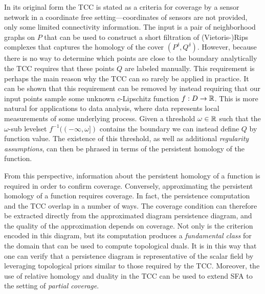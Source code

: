 In its original form the TCC is stated as a criteria for coverage by a sensor network in a coordinate free setting---coordinates of sensors are not provided, only some limited connectivity information.
The input is a pair of neighborhood graphs on $P$ that can be used to construct a short filtration of (Vietoris-)Rips complexes that captures the homology of the cover $(P^\delta, Q^\delta)$.
However, because there is no way to determine which points are close to the boundary analytically the TCC requires that these points $Q$ are labeled manually.
This requirement is perhaps the main reason why the TCC can so rarely be applied in practice.
It can be shown that this requirement can be removed by instead requiring that our input points sample some unknown $c$-Lipschitz function $f : D\to \mathbb{R}$.
This is more natural for applications to data analysis, where data represents local measurements of some underlying process.
Given a threshold $\omega\in\mathbb{R}$ such that the $\omega$-sub levelset $f^{-1}((-\infty,\omega])$ contains the boundary we can instead define $Q$ by function value.
The existence of this threshold, as well as additional \emph{regularity assumptions}, can then be phrased in terms of the persistent homology of the function.


From this perspective, information about the persistent homology of a function is required in order to confirm coverage.
Conversely, approximating the persistent homology of a function requires coverage.
In fact, the persistence computation and the TCC overlap in a number of ways.
The coverage condition can therefore be extracted directly from the approximated diagram persistence diagram, and the quality of the approximation depends on coverage.
Not only is the criterion encoded in this diagram, but its computation produces a \emph{fundamental class} for the domain that can be used to compute topological duals.
It is in this way that one can verify that a persistence diagram is representative of the scalar field by leveraging topological priors similar to those required by the TCC.
Moreover, the use of relative homology and duality in the TCC can be used to extend SFA to the setting of \emph{partial coverage}.

